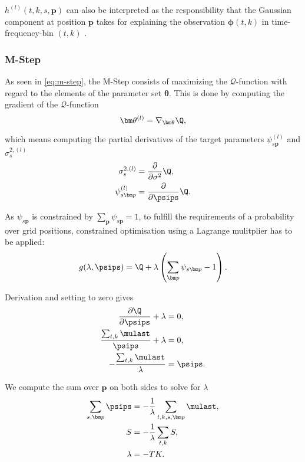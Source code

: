 $h^{(l)}(t,k,s,\bm p)$ can also be interpreted as the responsibility that the Gaussian component at position $\bm p$ takes for explaining the observation $\bm\phi(t,k)$ in time-frequency-bin $(t,k)$ \cite[p.~432]{Bishop2006}.

\subsubsection*{M-Step}
As seen in \eqref{eq:m-step}, the M-Step consists of maximizing the $\mathcal{Q}$-function with regard to the elements of the parameter set $\bm\theta$. This is done by computing the gradient of the $\mathcal{Q}$-function
\begin{equation}
\label{eq:m_step_theta_derivative}
    \bm\theta^{(l)}=\nabla_{\bm\theta}\Q,
\end{equation}

which means computing the partial derivatives of the target parameters $\psi_{s\bm p}^{(l)}$ and $\sigma_s^{2,(l)}$
\begin{align}
    \label{eq:m_step_sigma_derivative}
    \sigma_{s}^{2, (l)}&=\frac{\partial}{\partial \sigma^2}\Q,\\
    \label{eq:m_step_psi_derivative}
    \psi_{s\bm p}^{(l)}&=\frac{\partial}{\partial \psips}\Q.
\end{align}

As $\psi_{s\bm p}$ is constrained by $\sum_{\bm p}\psi_{s\bm p}=1$, to fulfill the requirements of a probability over grid positions, constrained optimisation using a Lagrange mulitplier has to be applied:
\begin{equation}
    g(\lambda,\psips)=\Q+\lambda\left (\sum_{\bm p}\psi_{s\bm p}-1\right ).
\end{equation}

Derivation and setting to zero gives
\begin{align}
    \frac{\partial\Q}{\partial\psips}+\lambda &=0,\\
    \frac{\sum_{t,k}\mulast}{\psips}+\lambda &=0,\\
    -\frac{\sum_{t,k}\mulast}{\lambda}&=\psips
\label{eq:psi-lambda}.
\end{align}

We compute the sum over $\bm p$ on both sides to solve for $\lambda$
\begin{align}
    \sum_{s,\bm p}\psips &=-\frac{1}{\lambda}\sum_{t,k,s,\bm p}\mulast,\\
    S&=-\frac{1}{\lambda}\sum_{t,k}S,\\
    \lambda &= -TK.\label{eq:lambda}
\end{align}

